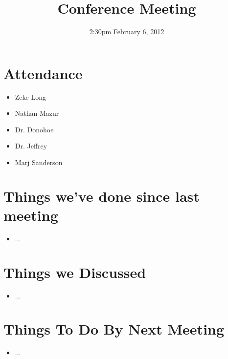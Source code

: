 \documentclass{article}
\begin{document}
\title{Conference Meeting}
\date{2:30pm February 6, 2012}
\maketitle

\section{Attendance}
\begin{itemize}
\item Zeke Long
\item Nathan Mazur
\item Dr. Donohoe
\item Dr. Jeffrey
\item Marj Sanderson
\end{itemize}

\section{Things we've done since last meeting}
\begin{itemize}
\item ...
\end{itemize}

\section{Things we Discussed}
\begin{itemize}
\item ...
\end{itemize}

\section{Things To Do By Next Meeting}
\begin{itemize}
\item ...
\end{itemize}
\end{document}
